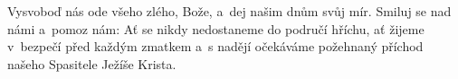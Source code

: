 Vysvoboď nás ode všeho zlého, Bože, a~dej našim dnům svůj mír. Smiluj se nad námi a~pomoz nám: Ať se nikdy nedostaneme do područí hříchu, ať žijeme v~bezpečí před každým zmatkem a~s nadějí očekáváme požehnaný příchod našeho Spasitele Ježíše Krista.
